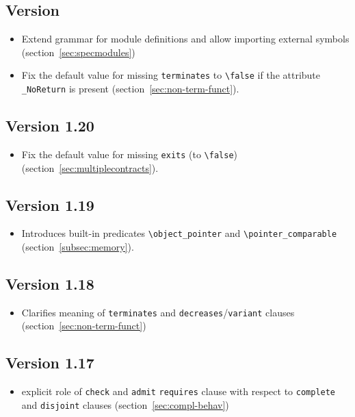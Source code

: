 \subsection{Version \version}
\begin{itemize}
\item Extend grammar for module definitions and allow importing external symbols
  (section~\ref{sec:specmodules})
\item Fix the default value for missing \lstinline|terminates| to
  \lstinline|\false| if the attribute \lstinline|_NoReturn| is present
  (section~\ref{sec:non-term-funct}).
\end{itemize}
\subsection{Version 1.20}
\begin{itemize}
\item Fix the default value for missing \lstinline|exits| (to
\lstinline|\false|) (section~\ref{sec:multiplecontracts}).
\end{itemize}
\subsection{Version 1.19}
\begin{itemize}
\item Introduces built-in predicates \lstinline|\object_pointer| and
\lstinline|\pointer_comparable| (section~\ref{subsec:memory}).
\end{itemize}
\subsection{Version 1.18}
\begin{itemize}
\item Clarifies meaning of \lstinline|terminates| and
  \lstinline|decreases|/\lstinline|variant| clauses (section~\ref{sec:non-term-funct})
\end{itemize}
\subsection{Version 1.17}
\begin{itemize}
\item explicit role of \lstinline|check| and \lstinline|admit| \lstinline|requires|
clause with respect to \lstinline|complete| and \lstinline|disjoint| clauses
(section~\ref{sec:compl-behav})
\end{itemize}
